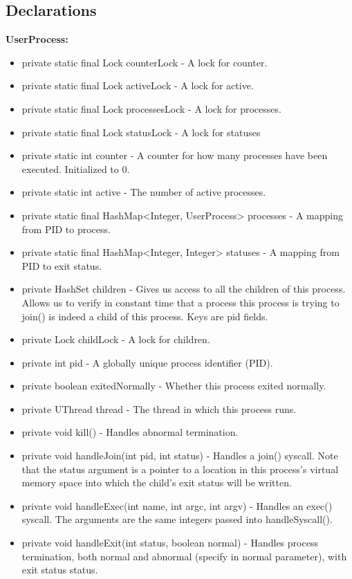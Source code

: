 \subsection{Declarations}
\textbf{UserProcess:}
\begin{itemize}
\item{\ttfamily private static final Lock counterLock} - A lock for {\ttfamily counter}.
\item{\ttfamily private static final Lock activeLock} - A lock for {\ttfamily active}.
\item{\ttfamily private static final Lock processesLock} - A lock for {\ttfamily processes}.
\item{\ttfamily private static final Lock statusLock} - A lock for {\ttfamily statuses}
\item{\ttfamily private static int counter} - A counter for how many processes have been executed. Initialized to 0.
\item{\ttfamily private static int active} - The number of active processes.
\item{\ttfamily private static final HashMap<Integer, UserProcess> processes} - A mapping from PID to process.
\item{\ttfamily private static final HashMap<Integer, Integer> statuses} - A mapping from PID to exit status.
\item{\ttfamily private HashSet children} - Gives us access to all the children of this process. Allows us to verify in constant time that a process this process is trying to join() is indeed a child of this process. Keys are pid fields.
\item{\ttfamily private Lock childLock} - A lock for {\ttfamily children}.
\item{\ttfamily private int pid} - A globally unique process identifier (PID).
\item{\ttfamily private boolean exitedNormally} - Whether this process exited normally.
\item{\ttfamily private UThread thread} - The thread in which this process runs.
\item{\ttfamily private void kill()} - Handles abnormal termination.
\item{\ttfamily private void handleJoin(int pid, int status)} - Handles a {\ttfamily join()} syscall. Note that the status argument is a pointer to a location in this process's virtual memory space into which the child's exit status will be written.
\item{\ttfamily private void handleExec(int name, int argc, int argv)} - Handles an {\ttfamily exec()} syscall. The arguments are the same integers passed into {\ttfamily handleSyscall()}.
\item{\ttfamily private void handleExit(int status, boolean normal)} - Handles process termination, both normal and abnormal (specify in {\ttfamily normal} parameter), with exit status {\ttfamily status}.
\end{itemize}
